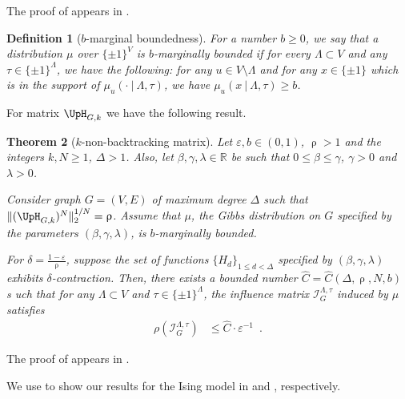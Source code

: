 \documentclass[11pt,reqno]{amsart}
\numberwithin{equation}{section}
\newtheorem{theorem}{Theorem}[section]
\newtheorem{definition}[theorem]{Definition}
\newcommand{\cI}{{\mathcal{I}}}
\newcommand{\bluepigment}[1]{{\color{blue(pigment)}#1}}
\newcommand{\cadmiumgreen}[1]{{\color{cadmiumgreen}#1}}
\newcommand{\goldenbrown}[1]{{\color{goldenbrown}#1}}
\newcommand{\heliotrope}[1]{{\color{heliotrope}#1}}
\newcommand{\red}[1]{{\color{red}#1}}
\newcommand{\maxDeg}{{\Delta}}
\newcommand{\logtrecur}{H}
\newcommand{\infmatrix}{\cI}
\newcommand{\spradius}{{\rho}}
\newcommand{\nnorm}[3]{\goldenbrown{\|} #1\goldenbrown{\|}^{#2}_{#3}}
\newcommand{\NBMatrix}{\cadmiumgreen{\UpH}_{G,\kk}}
\renewcommand{\bluepigment}[1]{#1}
\renewcommand{\cadmiumgreen}[1]{#1}
\renewcommand{\goldenbrown}[1]{#1}
\renewcommand{\heliotrope}[1]{#1}
\renewcommand{\red}[1]{#1}
\newcommand{\kd}{\goldenbrown{d}}
\newcommand{\kk}{\bluepigment{k}}
\newcommand{\ku}{\red{u}}
\newcommand{\kx}{\heliotrope{x}}
\renewcommand{\kd}{d}
\renewcommand{\kk}{k}
\renewcommand{\ku}{u}
\renewcommand{\kx}{x}
\newcommand{\SingBound}{\uprho}
\begin{document}
The proof of  appears in . 



\begin{definition}[$b$-marginal boundedness]
For a number $b\geq 0$, we say that a distribution $\mu$ over $\{\pm 1\}^V$ is $b$-marginally bounded if  for every 
$\Lambda\subset V$ and any $\tau\in \{\pm 1\}^{\Lambda}$,  we have the following: for any  $\ku\in V\setminus \Lambda$ 
and for any $\kx\in\{\pm 1\} $ which is in the support of $\mu_{\ku}(\cdot \ |\ \Lambda, \tau)$, we have
$\mu_{\ku}(\kx\ |\ \Lambda, \tau)\geq b$. 
\end{definition}
 



For matrix $\NBMatrix$ we have the following result. 



\begin{theorem}[$k$-non-backtracking matrix] \label{thrm:NonBacktrackingInfinityMixing}
Let $\varepsilon, b\in (0,1)$, $\SingBound>1$ and the integers $k,N \geq 1$, $\maxDeg > 1$. 
Also, let $\beta,\gamma, \lambda\in \mathbb{R}$ be such that $0\leq \beta\leq \gamma$, 
$\gamma >0$ and $\lambda>0$. 


Consider graph $G=(V,E)$ of maximum degree $\maxDeg$ such that  $\nnorm{ (\NBMatrix)^N}{1/N}{2} =\SingBound$.
Assume that $\mu$, the Gibbs distribution on $G$ specified by the parameters  
$(\beta, \gamma, \lambda)$, is $b$-marginally bounded.


For $\delta =\frac{1-\varepsilon}{\SingBound}$, suppose  the set of functions  
$\{\logtrecur_d\}_{1\leq \kd< \maxDeg}$  specified by $(\beta,\gamma,\lambda)$ exhibits 
$\delta$-contraction. Then,  there exists a bounded number $\widehat{C}=\widehat{C}(\maxDeg, \SingBound, N, b)$ s
uch that for any $\Lambda\subset V$ and $\tau\in \{\pm 1\}^{\Lambda}$, 
the influence matrix  $\infmatrix^{\Lambda,\tau}_{G}$ induced by $\mu$ satisfies
%
\begin{align}\nonumber 
\textstyle \spradius \left( \infmatrix^{\Lambda,\tau}_{G} \right) &\leq \widehat{C} \cdot \varepsilon^{-1} \enspace.
\end{align}
\end{theorem}

The proof of  appears in .



We use  to show our results for the Ising model
in  and , respectively. 
\end{document}
